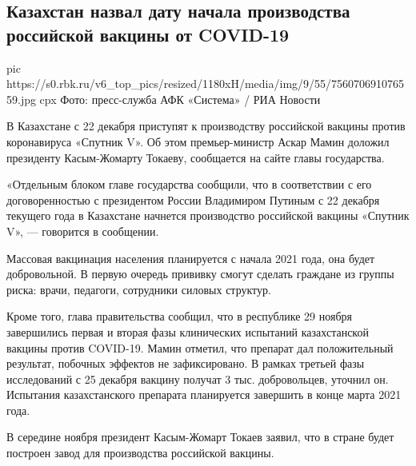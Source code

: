  
 
 
 
 
 
\subsection{Казахстан назвал дату начала производства российской вакцины от COVID-19}
\label{sec:04_12_2020.news.ru.rbc.1.kazahstan_rossia_vaccine_covid}


\ifcmt
pic https://s0.rbk.ru/v6_top_pics/resized/1180xH/media/img/9/55/756070691076559.jpg
cpx Фото: пресс-служба АФК «Система» / РИА Новости
\fi

В Казахстане с 22 декабря приступят к производству российской вакцины против
коронавируса «Спутник V». Об этом премьер-министр Аскар Мамин доложил
президенту Касым-Жомарту Токаеву, сообщается на сайте главы государства.

«Отдельным блоком главе государства сообщили, что в соответствии с его
договоренностью с президентом России Владимиром Путиным с 22 декабря текущего
года в Казахстане начнется производство российской вакцины «Спутник V», —
говорится в сообщении.

Массовая вакцинация населения планируется с начала 2021 года, она будет
добровольной. В первую очередь прививку смогут сделать граждане из группы
риска: врачи, педагоги, сотрудники силовых структур.

Кроме того, глава правительства сообщил, что в республике 29 ноября завершились
первая и вторая фазы клинических испытаний казахстанской вакцины против
COVID-19. Мамин отметил, что препарат дал положительный результат, побочных
эффектов не зафиксировано. В рамках третьей фазы исследований с 25 декабря
вакцину получат 3 тыс. добровольцев, уточнил он. Испытания казахстанского
препарата планируется завершить в конце марта 2021 года.

В середине ноября президент Касым-Жомарт Токаев заявил, что в стране будет
построен завод для производства российской вакцины.

